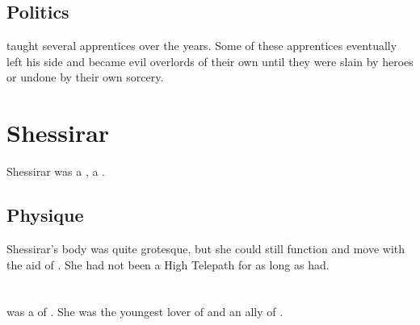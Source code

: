 \subsection{Politics}

\Sartheron taught several apprentices over the years.
Some of these apprentices eventually left his side and became evil overlords of their own until they were slain by heroes or undone by their own sorcery. 















\section{Shessirar}
Shessirar was a  \resvil, a . 









\subsection{Physique}
Shessirar's body was quite grotesque, but she could still function and move with the aid of \shapen. 
She had not been a High Telepath for as long as  had. 















\section{\Shiin}
\index{\Shiin}
\Shiin was a \resvil of \Baelzerach.
She was the youngest lover of  and an ally of \QuessanthIshnaruchaefir. 
















